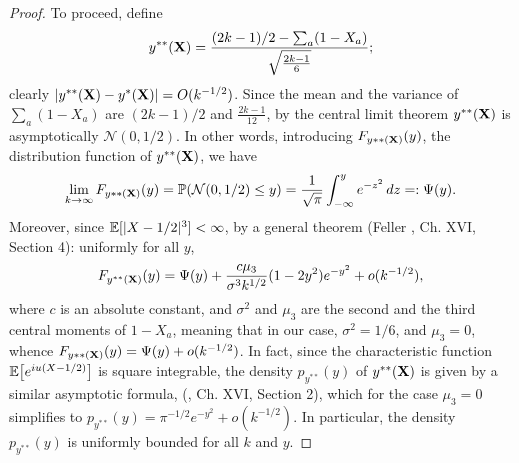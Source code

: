 \documentclass[11pt]{amsart}
\theoremstyle{remark}
\numberwithin{equation}{section}
\begin{document}
\begin{proof}
To proceed, define %
\[
y^{**}(\bold X)=\frac{(2k-1)/2-\sum_a(1-X_a)}{\sqrt{\frac{2k-1}{6}}};
\]
clearly $|y^{**}(\bold X)-y^*(\bold X)|=O(k^{-1/2})$.
Since the mean and the variance of $\sum_a(1-X_a)$ are $(2k-1)/2$ and $\frac{2k-1}{12}$, by the central limit theorem $y^{**}(\bold X)$ is asymptotically $\mathcal N(0,1/2)$. In other words, 
introducing $F_{y{**}(\bold X)}(y)$, the distribution function of $y^{**}(\bold X)$, we have
\[
\lim_{k\to\infty}F_{y{**}(\bold X)}(y)=\Bbb P(\mathcal N(0,1/2)\le y)=\frac{1}{\sqrt{\pi}}\int_{-\infty}^ye^{-z^2}\,dz=:\Psi(y).
\]
Moreover, since $\Bbb E[|X-1/2|^3]<\infty$, by a general theorem (Feller \cite{Fel}, Ch. XVI, Section 4): uniformly for all $y$,
\[
F_{y^{**}(\bold X)}(y)=\Psi(y) +\frac{c\mu_3}{\sigma^3k^{1/2}}(1-2y^2)e^{-y^2}+o(k^{-1/2}),
\]
where $c$ is an absolute constant, and $\sigma^2$ and $\mu_3$ are the second and the third central moments of $1-X_a$, meaning that in our case, $\sigma^2=1/6$, and $\mu_3=0$, whence $F_{y{**}(\bold X)}(y)=\Psi(y)+o(k^{-1/2})$. In fact, since the characteristic function $\Bbb E\bigl[e^{iu(X-1/2)}\bigr]$ is square integrable, the density $p_{y^{**}}(y)$ of $y^{**}(\bold X)$ is given by a similar asymptotic formula,
(\cite{Fel}, Ch. XVI, Section 2), which for the case $\mu_3=0$ simplifies to 
$p_{y^{**}}(y)%
=\pi^{-1/2} e^{-y^2}+o(k^{-1/2})$.
In particular, the density $p_{y^{**}}(y)$ is uniformly bounded for all $k$ and $y$. 


\end{proof}
\end{document}

